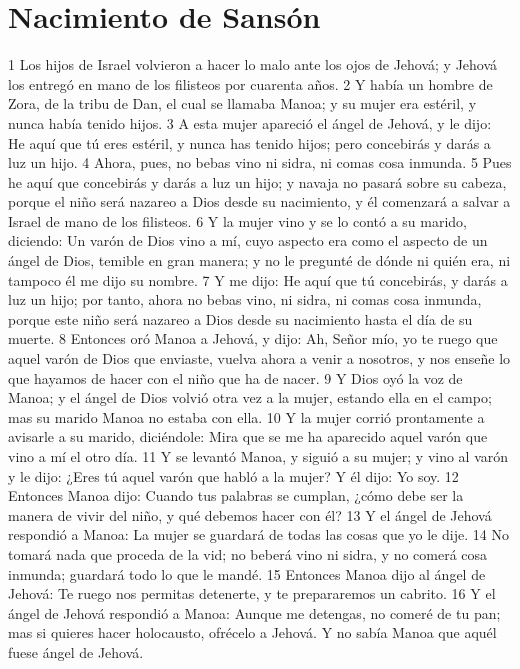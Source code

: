 \section*{Nacimiento de Sansón}


1 Los hijos de Israel volvieron a hacer lo malo ante los ojos de Jehová; y Jehová los entregó en mano de los filisteos por cuarenta años.
2 Y había un hombre de Zora, de la tribu de Dan, el cual se llamaba Manoa; y su mujer era estéril, y nunca había tenido hijos.
3 A esta mujer apareció el ángel de Jehová, y le dijo: He aquí que tú eres estéril, y nunca has tenido hijos; pero concebirás y darás a luz un hijo.
4 Ahora, pues, no bebas vino ni sidra, ni comas cosa inmunda.
5 Pues he aquí que concebirás y darás a luz un hijo; y navaja no pasará sobre su cabeza, porque el niño será nazareo a Dios desde su nacimiento, y él comenzará a salvar a Israel de mano de los filisteos.
6 Y la mujer vino y se lo contó a su marido, diciendo: Un varón de Dios vino a mí, cuyo aspecto era como el aspecto de un ángel de Dios, temible en gran manera; y no le pregunté de dónde ni quién era, ni tampoco él me dijo su nombre.
7 Y me dijo: He aquí que tú concebirás, y darás a luz un hijo; por tanto, ahora no bebas vino, ni sidra, ni comas cosa inmunda, porque este niño será nazareo a Dios desde su nacimiento hasta el día de su muerte.
8 Entonces oró Manoa a Jehová, y dijo: Ah, Señor mío, yo te ruego que aquel varón de Dios que enviaste, vuelva ahora a venir a nosotros, y nos enseñe lo que hayamos de hacer con el niño que ha de nacer.
9 Y Dios oyó la voz de Manoa; y el ángel de Dios volvió otra vez a la mujer, estando ella en el campo; mas su marido Manoa no estaba con ella.
10 Y la mujer corrió prontamente a avisarle a su marido, diciéndole: Mira que se me ha aparecido aquel varón que vino a mí el otro día.
11 Y se levantó Manoa, y siguió a su mujer; y vino al varón y le dijo: ¿Eres tú aquel varón que habló a la mujer? Y él dijo: Yo soy.
12 Entonces Manoa dijo: Cuando tus palabras se cumplan, ¿cómo debe ser la manera de vivir del niño, y qué debemos hacer con él?
13 Y el ángel de Jehová respondió a Manoa: La mujer se guardará de todas las cosas que yo le dije.
14 No tomará nada que proceda de la vid; no beberá vino ni sidra, y no comerá cosa inmunda; guardará todo lo que le mandé.
15 Entonces Manoa dijo al ángel de Jehová: Te ruego nos permitas detenerte, y te prepararemos un cabrito.
16 Y el ángel de Jehová respondió a Manoa: Aunque me detengas, no comeré de tu pan; mas si quieres hacer holocausto, ofrécelo a Jehová. Y no sabía Manoa que aquél fuese ángel de Jehová.
